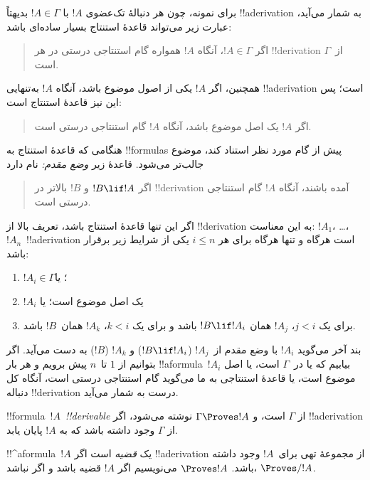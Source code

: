 \documentclass[../../../include/open-logic-section]{subfiles}
\begin{document}
برای نمونه، چون هر دنبالهٔ تک‌عضوی $!A$ با $!A \in \Gamma$ بدیهتاً
!!a{derivation} به شمار می‌آید، عبارت زیر می‌تواند قاعدهٔ استنتاج بسیار
ساده‌ای باشد:
\begin{quote}
  اگر $!A \in \Gamma$، آنگاه $!A$ همواره گام استنتاجی درستی در هر
  !!{derivation} از~$\Gamma$ است.
\end{quote}
همچنین، اگر $!A$ یکی از اصول موضوع باشد، آنگاه $!A$ به‌تنهایی
!!a{derivation} است؛ پس این نیز قاعدهٔ استنتاج است:
\begin{quote}
  اگر $!A$ یک اصل موضوع باشد، آنگاه $!A$ گام استنتاجی درستی است.
\end{quote}
هنگامی که قاعدهٔ استنتاج به !!{formula}s پیش از گام مورد نظر استناد کند،
موضوع جالب‌تر می‌شود. قاعدهٔ زیر \emph{وضع مقدم:} نام دارد
\begin{quote}
  اگر $!B \lif !A$ و $!B$ بالاتر در !!{derivation} آمده باشند، آنگاه
  $!A$ گام استنتاجی درستی است.
\end{quote}
اگر این تنها قاعدهٔ استنتاج باشد، تعریف بالا از !!{derivation} به این
معناست: $!A_1$، \dots،~$!A_n$~!!a{derivation} است هرگاه و تنها هرگاه
برای هر $i \le n$ یکی از شرایط زیر برقرار باشد:
\begin{enumerate}
\item $!A_i \in \Gamma$؛ یا
\item $!A_i$ یک اصل موضوع است؛ یا
\item برای یک $j < i$، $!A_j$ همان $!B \lif !A_i$ باشد و برای یک
  $k < i$، $!A_k$ همان~$!B$ باشد.
\end{enumerate}
بند آخر می‌گوید $!A_i$ با وضع مقدم از~$!A_j$ ($!B \lif !A_i$) و
$!A_k$ ($!B$) به دست می‌آید. اگر بتوانیم از $1$ تا~$n$ پیش برویم و هر
بار !!a{formula}~$!A_i$ بیابیم که یا در~$\Gamma$ است، یا اصل موضوع است،
یا قاعدهٔ استنتاجی به ما می‌گوید گام استنتاجی درستی است، آنگاه کل دنباله
!!{derivation} درست به شمار می‌آید.

\begin{defn}[!!^{derivability}]
!!{formula}~$!A$~\emph{!!{derivable}} از $\Gamma$ است، و
$\Gamma \Proves !A$ نوشته می‌شود، اگر !!a{derivation} از $\Gamma$ وجود
داشته باشد که به $!A$ پایان یابد.
\end{defn}

\begin{defn}[قضیه‌ها]
!!^a{formula}~$!A$ یک \emph{قضیه} است اگر !!a{derivation} از مجموعهٔ
تهی برای~$!A$ وجود داشته باشد. $\Proves !A$ می‌نویسیم اگر $!A$ قضیه
باشد و اگر نباشد، $\Proves/ !A$.
\end{defn}
\end{document}
